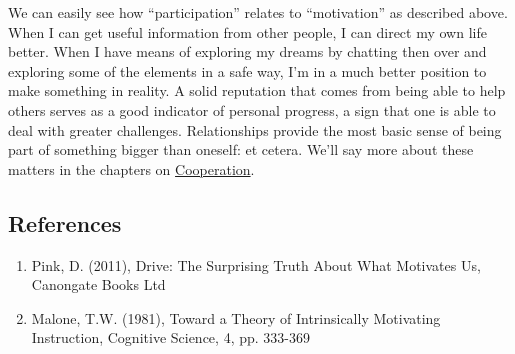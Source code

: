 We can easily see how ``participation'' relates to ``motivation'' as
described above. When I can get useful information from other people, I
can direct my own life better. When I have means of exploring my dreams
by chatting then over and exploring some of the elements in a safe way,
I'm in a much better position to make something in reality. A solid
reputation that comes from being able to help others serves as a good
indicator of personal progress, a sign that one is able to deal with
greater challenges. Relationships provide the most basic sense of being
part of something bigger than oneself: et cetera. We'll say more about
these matters in the chapters on
\href{http://peeragogy.org/cowork/}{Cooperation}.

\subsection{References}

\begin{enumerate}
\item
  Pink, D. (2011), Drive: The Surprising Truth About What Motivates Us,
  Canongate Books Ltd
\item
  Malone, T.W. (1981), Toward a Theory of Intrinsically Motivating
  Instruction, Cognitive Science, 4, pp. 333-369
\end{enumerate}
